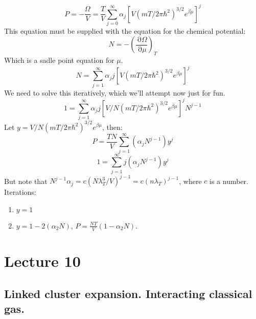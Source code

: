 \documentclass[12 pt]{article}
\DeclareMathOperator {\p} {\partial}
\begin{document}
\[    P = - \frac{\Omega}{V} = \frac{T}{V}  \sum_{j=0}^{\infty} \alpha_j \left[ V (mT/2\pi\hbar^2)^{3/2} e^{\beta \mu}  \right] ^j    \]
This equation must be supplied with the equation for the chemical potential:
\[     N = - \left(  \frac{\p \Omega}{\p \mu} \right)_T      \]
Which is a sadle point equation for $\mu$.
\[       N = \sum_{j=1}^{\infty} \alpha_j j  \left[ V (mT/2\pi\hbar^2)^{3/2} e^{\beta \mu}  \right] ^j        \]
We need to solve this iteratively, which we'll attempt now just for fun.
\[      1 =   \sum_{j=1}^{\infty} \alpha_j j  \left[ V/N (mT/2\pi\hbar^2)^{3/2} e^{\beta \mu}  \right] ^j N^{j-1}   \]
Let $y =  V/N (mT/2\pi\hbar^2)^{3/2} e^{\beta \mu}$, then:
\[     P = \frac{TN}{V} \sum_{j=1}^{\infty} (\alpha_j N^{j-1}) y^j      \]
\[    1 =     \sum_{j=1}^{\infty} j (\alpha_j N^{j-1}) y^j     \]
But note that $N^{j-1} \alpha_j = c (N\lambda_T^3 /V)^{j-1} = c (n\lambda_T)^{j-1}$, where $c$ is a number. Iterations:
\begin{enumerate} [(0)]
\item $y=1$
\item $ y = 1 - 2(\alpha_2 N)$, $P = \frac{NT}{V} \left( 1 - \alpha_2 N \right)$.
\end{enumerate}

\section*{Lecture 10}
\subsection*{Linked cluster expansion. Interacting classical gas.}
\end{document}
